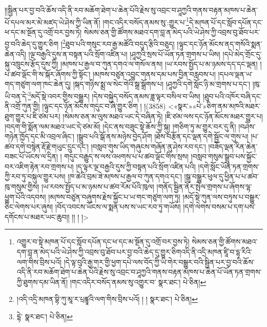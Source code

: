 །།སྦྱིན་པར་བྱ་བའི་ཆོས་འདི་ནི་རབ་མཆོག་ཐེག་པ་ཆེན་པོའི་རྗེས་སུ་འབྲང་བ་ཤཱཀྱའི་གནས་བརྟན་མཁས་པ་ཆེན་པོ་དཔལ་མར་མེ་མཛད་ཡེ་ཤེས་ཀྱི་ཡིན་ནོ། །གང་འདིར་བསོད་ནམས་སུ་:གྱུར་པ་\footnote{འགྱུར་བ་སྟེ་མཁན་པོ་དང་སློབ་དཔོན་དང་ཕ་དང་མ་སྔོན་དུ་འགྲོ་བར་བྱས་ཏེ། སེམས་ཅན་གྱི་ཚོགས་མཐའ་དག་བླ་ན་མེད་པའི་ཡེ་ཤེས་ཀྱི་འབྲས་བུ་ཐོབ་པར་བྱ་བའི་ཆེད་དུ་གྱུར་ཅིགའདི་ནི་འདྲི་མཁན་ཛཱི་བ་དྷ་རིའི་ལག་གིས་བྲིས་པའོ། །དེ་ལྟ་བུའི་རྒྱ་གར་གྱི་ཕྱག་དཔེ་ལས་བོད་ཀྱི་ཡི་གེར་བསྒྱུར་བའི་སྦྱིན་པར་བྱ་བའི་ཆོས་འདི་ནི་རབ་མཆོག་ཐེག་པ་ཆེན་པོའི་རྗེས་སུ་འབྲང་བ་ཤཱཀྱའི་གནས་བརྟན་མཁས་པ་ཆེན་པོ་ཡོན་ཏན་གྲགས་ཀྱི་ཐུགས་དམ་ཡིན་ནོ། །གང་འདིར་བསོད་ནམས་སུ་འགྱུར་བ་  སྣར་ཐང་།  པེ་ཅིན། }དེ་མཁན་པོ་དང་སློབ་དཔོན་དང་ཕ་དང་མ་སྔོན་དུ་འགྲོ་བར་བྱས་ཏེ། སེམས་ཅན་གྱི་ཚོགས་མཐའ་དག་བླ་ན་མེད་པའི་ཡེ་ཤེས་ཀྱི་འབྲས་བུ་ཐོབ་པར་བྱ་བའི་ཆེད་དུ་གྱུར་ཅིག །\footnote{།འདི་འདྲི་མཁན་བྷི་ཀུ་མཱ་ར་པྲཛྙཱའི་ལག་གིས་བྲིས་པའོ། ། །  སྣར་ཐང་།  པེ་ཅིན། }ཐུབ་པའི་གསུང་རབ་རྒྱ་མཚོའི་བདུད་རྩིའི་བཅུད། །ལྟུང་དང་ཉོན་མོངས་ནད་གསོའི་སྨན་ཆེན་འདི། །ལྔ་བརྒྱའི་དུས་ན་བསྟན་པའི་སྲོག་འཛིན་པ། །ཤཱཀྱའི་སྲས་པོ་ཡོན་ཏན་གྲགས་པ་ཡིས། །དཔེ་མེད་གྲོང་དུ་སྐུ་འཁྲུངས་རྩོད་དུས་ཀྱི། །མཁས་པ་རྒྱལ་བ་ཀུན་དགའ་ལ་གསོལ་ནས། །ཡ་རབས་སྤྱོད་པ་མ་ཉམས་དད་དང་ལྡན། །པ་ཚབ་ལྡོང་གི་ས་སྐོར་ཞོགས་ཀྱི་སྟོང་། །མཁས་བཙུན་འབྱུང་གནས་དམ་པས་བྱིན་བརླབས་པ། །དཔལ་ལྡན་ཡ་གད་གཙུག་ལག་ཁང་ཆེན་དུ། །སྐད་གཉིས་སྨྲ་ལ་སེང་གེའི་སྒྲ་སྒྲོགས་པ། །ཤཱཀྱའི་དགེ་སློང་ཉི་མ་གྲགས་པ་དང་། །ཁུ་ཡི་བན་དེ་\footnote{དྷེ་  སྣར་ཐང་།  པེ་ཅིན། }མདོ་སྡེ་འབར་གྱིས་བསྒྱུར། །དེས་བསྐྱེད་བསོད་ནམས་ཟླ་ལྟར་བསིལ་བ་ཡིས། །ཐུབ་པའི་འཁོར་བཞི་དང་ནི་འགྲོ་ཀུན་གྱི། །ལྟུང་དང་ཉོན་མོངས་གདུང་བ་ཞི་གྱུར་ཅིག ། །(3858) <«སྣར་»«པེ་»ཅིག་ནམ་མཁའི་མཐར་ཐུག་གྱུར་པ་ཇི་ཙམ་པར། །སེམས་ཅན་མ་ལུས་མཐའ་ཡང་དེ་བཞིན་ཏེ། །ཇི་ཙམ་ལས་དང་ཉོན་མོངས་མཐར་གྱུར་པ། །བདག་གི་སྨོན་ལམ་མཐའ་ཡང་དེ་ཙམ་མོ། །དེང་ནས་བཟུང་སྟེ་ཆོས་ཀྱི་སྐུ། །གཅིག་ཏུ་མ་གྱུར་བར་དུ་ནི། །བཤེས་གཉེན་ཁྱོད་དང་མི་འབྲལ་ཞིང་། །སྒྲུབ་པའི་སྒོ་ནས་མཉེས་བྱེད་ཤོག །ཐོས་བརྩོན་དང་ལྡན་དགེ་སྦྱོང་ལ་གུས་པ། །པ་ཚབ་དགེ་བསྙེན་རྡོ་རྗེ་གཡུང་དྲུང་དང་། །བསླབ་གུས་ཡིད་གཞུངས་གཞོན་ནུ་ཤེས་རབ་དང་། །བཟོད་ལྡན་རིན་ཆེན་བཟང་པོ་ཡོངས་ལ་དྲིན། །
གདུང་བརྒྱུད་ས་ལས་འཕགས་པ་པ་ཚབ་ལྡོང་གིས་སྲས། །བསླབ་གསུམ་སྒྲུབ་པས་སྐྱོང་བར་འཇིག་རྟེན་རབ་གྲགས་པ། །ད་ལྟར་ལྔ་བརྒྱའི་དུས་ཀྱི་བསྟན་པའི་སྲོག་འཛིན་པའི། །དགེ་སློང་ཡོན་ཏན་གྲགས་ཀྱི་རབ་ཏུ་བསྐུལ་གྱུར་པས། །ཁ་ཆེའི་བྲམ་ཟེ་མཁས་པ་རྒྱལ་བ་ཀུན་དགའ་དང་། །སྒྲ་བསྒྱུར་ཕུལ་དུ་ཕྱིན་པ་པ་ཚབ་ཁུ་གསུམ་གྱིས། །ཡ་རབས་སྤྱོད་པ་མ་ཉམས་པ་ཚབ་རོམ་པོའི་ཁུལ། །གནོད་སྦྱིན་ནོར་སྤེལ་གྲགས་པ་ཞོགས་ལྷ་ཕྱུག་པོའི་འདབས། །མཁས་བཙུན་བཞུགས་རྗེས་སྐྱོང་པ་ཡ་གང་གཙུག་ལག་ཏུ། །མདོ་སྡེ་ཀུན་ལས་བཏུས་པ་བསྒྱུར་ཅིང་ལེགས་པར་ཞུས། །བོད་འབངས་ཡོངས་ལ་སྨན་པས་ས་ཡང་རབ་ཏུ་གཡོས། །དགེ་ལེགས་བསམ་པ་དག་པས་དགོངས་པ་མཐར་ཡང་ཆུབ།། །། ། །>